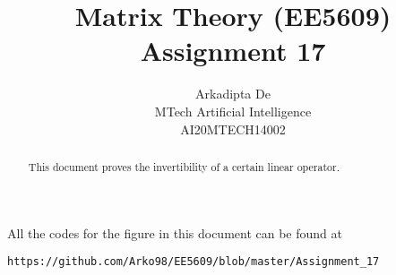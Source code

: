 \documentclass[journal,12pt,twocolumn]{IEEEtran}
\DeclareMathOperator*{\Res}{Res}
\begin{document}
\providecommand{\abs}[1]{\left\vert#1\right\vert}
\providecommand{\res}[1]{\Res\displaylimits_{#1}} 
\providecommand{\norm}[1]{\left\lVert#1\right\rVert}
\providecommand{\mtx}[1]{\mathbf{#1}}
\providecommand{\mean}[1]{E\left[ #1 \right]}
\providecommand{\fourier}{\overset{\mathcal{F}}{ \rightleftharpoons}}
\providecommand{\system}{\overset{\mathcal{H}}{ \longleftrightarrow}}
\newcommand{\solution}{\noindent \textbf{Solution: }}
\newcommand{\cosec}{\,\text{cosec}\,}
\providecommand{\dec}[2]{\ensuremath{\overset{#1}{\underset{#2}{\gtrless}}}}
\newcommand{\myvec}[1]{\ensuremath{\begin{pmatrix}#1\end{pmatrix}}}
\newcommand{\mydet}[1]{\ensuremath{\begin{vmatrix}#1\end{vmatrix}}}
\makeatletter
{}
\makeatother
\let\StandardTheFigure\thefigure
\let\vec\mathbf
\renewcommand{\thefigure}{\theproblem}
\def\putbox#1#2#3{\makebox[0in][l]{\makebox[#1][l]{}\raisebox{\baselineskip}[0in][0in]{\raisebox{#2}[0in][0in]{#3}}}}
     \def\rightbox#1{\makebox[0in][r]{#1}}
     \def\centbox#1{\makebox[0in]{#1}}
     \def\topbox#1{\raisebox{-\baselineskip}[0in][0in]{#1}}
     \def\midbox#1{\raisebox{-0.5\baselineskip}[0in][0in]{#1}}
\vspace{3cm}
\title{Matrix Theory (EE5609) Assignment 17}
\author{Arkadipta De\\MTech Artificial Intelligence\\AI20MTECH14002}

\maketitle
\newpage
\bigskip
\renewcommand{\thefigure}{\theenumi}
\renewcommand{\thetable}{\theenumi}

\begin{abstract}
This document proves the invertibility of a certain linear operator. 
\end{abstract}
All the codes for the figure in this document can be found at
\begin{lstlisting}
https://github.com/Arko98/EE5609/blob/master/Assignment_17
\end{lstlisting}
\end{document}
